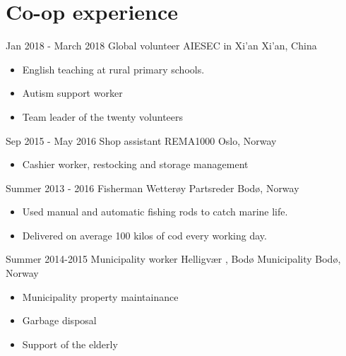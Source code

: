 \documentclass[10pt, letterpaper]{moderncv}
\begin{document}
\section{Co-op experience}
    \begin{samepage}
      \cventry
          {Jan 2018 - March 2018}
          {Global volunteer}
          {%
%
AIESEC in Xi'an%
}
          {Xi'an, China}
        {}
        {
            \begin{itemize}
                \item{English teaching at rural primary schools.}
                \item{Autism support worker}
                \item{Team leader of the twenty volunteers}
            \end{itemize}
        }
    \end{samepage}
    \begin{samepage}
      \cventry
          {Sep 2015 - May 2016}
          {Shop assistant}
          {%
%
REMA1000%
}
          {Oslo, Norway}
        {}
        {
            \begin{itemize}
                \item{Cashier worker, restocking and storage management}
            \end{itemize}
        }
    \end{samepage}
    \begin{samepage}
      \cventry
          {Summer 2013 - 2016}
          {Fisherman}
          {%
%
Wetterøy Partsreder%
}
          {Bodø, Norway}
        {}
        {
            \begin{itemize}
                \item{Used manual and automatic fishing rods to catch marine life.}
                \item{Delivered on average 100 kilos of cod every working day.}
            \end{itemize}
        }
    \end{samepage}
    \begin{samepage}
      \cventry
          {Summer 2014-2015}
          {Municipality worker}
          {%
Helligvær
, %
Bodø Municipality%
}
          {Bodø, Norway}
        {}
        {
            \begin{itemize}
                \item{Municipality property maintainance}
                \item{Garbage disposal}
                \item{Support of the elderly}
            \end{itemize}
        }
    \end{samepage}
\end{document}
